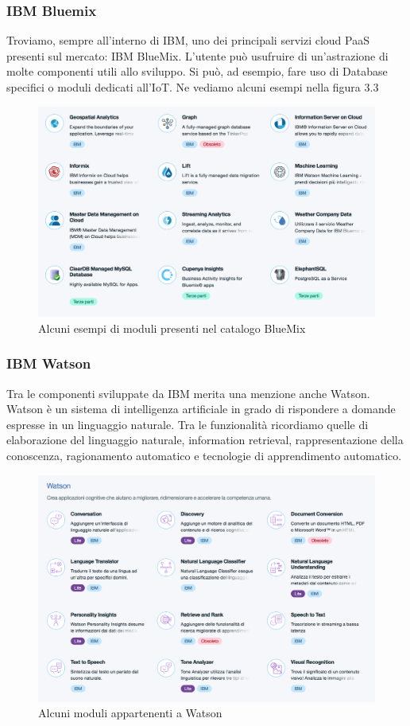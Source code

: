 \subsubsection{IBM Bluemix}
Troviamo, sempre all'interno di IBM, uno dei principali servizi cloud PaaS presenti sul mercato: IBM BlueMix. L'utente può usufruire di un'astrazione di molte componenti utili allo sviluppo. Si può, ad esempio, fare uso di Database specifici o moduli dedicati all'IoT. Ne vediamo alcuni esempi nella figura 3.3
\begin{figure}
	\centering
	\includegraphics[width=0.7\linewidth]{capitoli/imgs/catalog}
	\caption{Alcuni esempi di moduli presenti nel catalogo BlueMix}
	\label{fig:catalog}
\end{figure}
\subsubsection{IBM Watson}
Tra le componenti sviluppate da IBM merita una menzione anche Watson. Watson è un sistema di intelligenza artificiale in grado di rispondere a domande espresse in un linguaggio naturale. Tra le funzionalità ricordiamo quelle di elaborazione del linguaggio naturale, information retrieval, rappresentazione della conoscenza, ragionamento automatico e tecnologie di apprendimento automatico.
\begin{figure}
	\centering
	\includegraphics[width=0.7\linewidth]{capitoli/imgs/watson}
	\caption{Alcuni moduli appartenenti a Watson}
	\label{fig:watson}
\end{figure}


